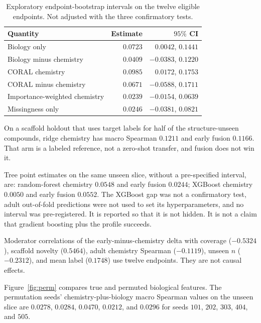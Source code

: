 \documentclass[10pt]{article}
\begin{document}
\begin{table}[h]
\caption{Exploratory endpoint-bootstrap intervals on the twelve eligible endpoints. Not adjusted with the three confirmatory tests.}
\label{tab:explore}
\centering
\small
\begin{tabular}{lrr}
\toprule
Quantity & Estimate & $95\%$ CI \\
\midrule
Biology only & $0.0723$ & $0.0042$, $0.1441$ \\
Biology minus chemistry & $0.0409$ & $-0.0383$, $0.1220$ \\
CORAL chemistry & $0.0985$ & $0.0172$, $0.1753$ \\
CORAL minus chemistry & $0.0671$ & $-0.0588$, $0.1711$ \\
Importance-weighted chemistry & $0.0239$ & $-0.0154$, $0.0639$ \\
Missingness only & $0.0246$ & $-0.0381$, $0.0821$ \\
\bottomrule
\end{tabular}
\end{table}

On a scaffold holdout that uses target labels for half of the structure-unseen compounds, ridge chemistry has macro Spearman $0.1211$ and early fusion $0.1166$.
That arm is a labeled reference, not a zero-shot transfer, and fusion does not win it.

Tree point estimates on the same unseen slice, without a pre-specified interval, are: random-forest chemistry $0.0548$ and early fusion $0.0244$; XGBoost chemistry $0.0050$ and early fusion $0.0552$.
The XGBoost gap was not a confirmatory test, adult out-of-fold predictions were not used to set its hyperparameters, and no interval was pre-registered.
It is reported so that it is not hidden.
It is not a claim that gradient boosting plus the profile succeeds.

Moderator correlations of the early-minus-chemistry delta with coverage ($-0.5324$), scaffold novelty ($0.5464$), adult chemistry Spearman ($-0.1119$), unseen $n$ ($-0.2312$), and mean label ($0.1748$) use twelve endpoints.
They are not causal effects.

Figure~\ref{fig:perm} compares true and permuted biological features.
The permutation seeds' chemistry-plus-biology macro Spearman values on the unseen slice are $0.0278$, $0.0284$, $0.0470$, $0.0212$, and $0.0296$ for seeds $101$, $202$, $303$, $404$, and $505$.
\end{document}
